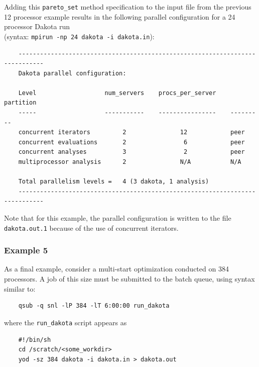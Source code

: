 Adding this \texttt{pareto\_set} method specification to the input file from 
the previous 12 processor example results in the following parallel configuration
for a 24 processor Dakota run \\
(syntax: \texttt{mpirun -np 24 dakota -i dakota.in}):
\begin{small}
\begin{verbatim}
    -----------------------------------------------------------------------------
    Dakota parallel configuration:

    Level                   num_servers    procs_per_server    partition
    -----                   -----------    ----------------    ---------
    concurrent iterators         2               12            peer
    concurrent evaluations       2                6            peer
    concurrent analyses          3                2            peer
    multiprocessor analysis      2               N/A           N/A

    Total parallelism levels =   4 (3 dakota, 1 analysis)
    -----------------------------------------------------------------------------
\end{verbatim}
\end{small}

Note that for this example, the parallel configuration is written to the
file \texttt{dakota.out.1} because of the use of concurrent iterators.

\subsubsection{Example 5}\label{parallel:spec:multi:example5}

As a final example, consider a multi-start optimization conducted on
384 processors. A job of this size must be submitted to
the batch queue, using syntax similar to:
\begin{small}
\begin{verbatim}
    qsub -q snl -lP 384 -lT 6:00:00 run_dakota
\end{verbatim}
\end{small}

where the \texttt{run\_dakota} script appears as
\begin{small}
\begin{verbatim}
    #!/bin/sh
    cd /scratch/<some_workdir>
    yod -sz 384 dakota -i dakota.in > dakota.out
\end{verbatim}
\end{small}

